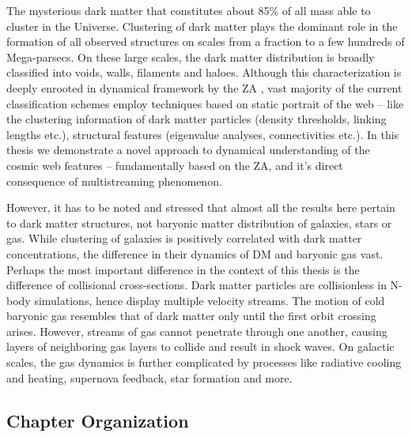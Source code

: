 The mysterious dark matter that constitutes about 85\% of all mass able to cluster in the Universe. Clustering of dark matter plays the dominant role in the formation of all observed structures on scales from a fraction to a few hundreds of Mega-parsecs. On these large scales, the dark matter distribution is broadly classified into voids, walls, filaments and haloes. Although this characterization is deeply enrooted in dynamical framework by the ZA \citep{Zeldovich1970, Shandarin1989}, vast majority of the current classification schemes employ techniques based on static portrait of the web -- like the clustering information of dark matter particles (density thresholds, linking lengths etc.), structural features (eigenvalue analyses, connectivities etc.). In this thesis we demonstrate a novel approach to dynamical understanding of the cosmic web features -- fundamentally based on the ZA, and it's direct consequence of multistreaming phenomenon.   

However, it has to be noted and stressed that almost all the results here pertain to dark matter structures, not baryonic matter distribution of galaxies, stars or gas. While clustering of galaxies is positively correlated with dark matter concentrations, the difference in their dynamics of DM and baryonic gas vast. Perhaps the most important difference in the context of this thesis is the difference of collisional cross-sections. Dark matter particles are collisionless in N-body simulations, hence display multiple velocity streams. The motion of cold baryonic gas resembles that of dark matter only until the first orbit crossing arises. However, streams of gas cannot penetrate through one another, causing layers of neighboring gas layers to collide and result in shock waves. On galactic scales, the gas dynamics is further complicated by processes like radiative cooling and heating, supernova feedback, star formation and more. 


\subsection{Chapter Organization}


